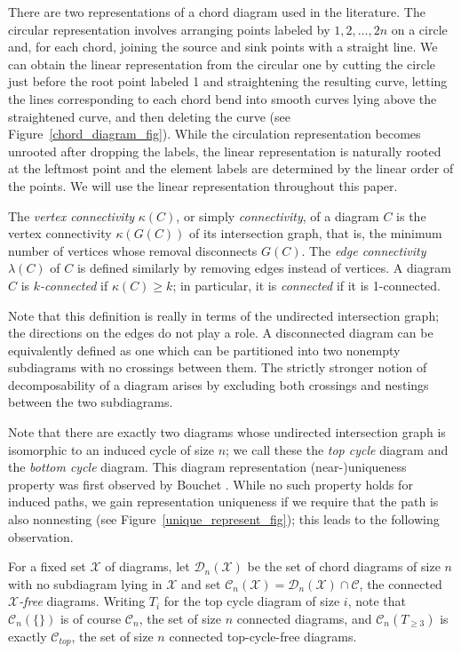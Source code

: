 There are two representations of a chord diagram used in the literature. The circular representation involves arranging points labeled by $1, 2, \ldots, 2n$ on a circle and, for each chord, joining the source and sink points with a straight line. We can obtain the linear representation from the circular one by cutting the circle just before the root point labeled 1 and straightening the resulting curve, letting the lines corresponding to each chord bend into smooth curves lying above the straightened curve, and then deleting the curve (see Figure~\ref{chord_diagram_fig}). While the circulation representation becomes unrooted after dropping the labels, the linear representation is naturally rooted at the leftmost point and the element labels are determined by the linear order of the points. We will use the linear representation throughout this paper. 

\begin{definition} The {\em vertex connectivity} $\kappa(C)$, or simply {\em connectivity}, of a diagram $C$ is the vertex connectivity $\kappa(G(C))$ of its intersection graph, that is, the minimum number of vertices whose removal disconnects $G(C)$. The {\em edge connectivity} $\lambda(C)$ of $C$ is defined similarly by removing edges instead of vertices. A diagram $C$ is {\em $k$-connected} if $\kappa(C) \geqslant k$; in particular, it is {\em connected} if it is 1-connected.   
\end{definition}

Note that this definition is really in terms of the undirected intersection graph; the directions on the edges do not play a role. A disconnected diagram can be equivalently defined as one which can be partitioned into two nonempty subdiagrams with no crossings between them. The strictly stronger notion of decomposability of a diagram arises by excluding both crossings and nestings between the two subdiagrams.

Note that there are exactly two diagrams whose undirected intersection graph is isomorphic to an induced cycle of size $n$; we call these the {\em top cycle} diagram and the {\em bottom cycle} diagram. This diagram representation (near-)uniqueness property was first observed by Bouchet \cite{Bouchet1994}. While no such property holds for induced paths, we gain representation uniqueness if we require that the path is also nonnesting (see Figure~\ref{unique_represent_fig}); this leads to the following observation. 

For a fixed set $\mathcal{X}$ of diagrams, let $\mathcal{D}_{n}(\mathcal{X})$ be the set of chord diagrams of size $n$ with no subdiagram lying in $\mathcal{X}$ and set $\mathcal{C}_{n}(\mathcal{X}) = \mathcal{D}_{n}(\mathcal{X}) \cap \mathcal{C}$, the connected {\em $\mathcal{X}$-free} diagrams. Writing $T_{i}$ for the top cycle diagram of size $i$, note that $\mathcal{C}_{n}(\{\})$ is of course $\mathcal{C}_{n}$, the set of size $n$ connected diagrams, and $\mathcal{C}_{n}(T_{\geqslant 3})$ is exactly $\mathcal{C}_{top}$, the set of size $n$ connected top-cycle-free diagrams. 

